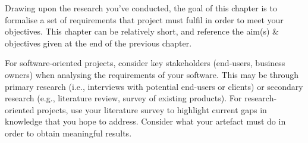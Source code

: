 Drawing upon the research you've conducted, the goal of this chapter is to formalise a set of requirements that project must fulfil in order to meet your objectives. This chapter can be relatively short, and reference the aim(s) \& objectives given at the end of the previous chapter. 

For software-oriented projects, consider key stakeholders (end-users, business owners) when analysing the requirements of your software. This may be through primary research (i.e., interviews with potential end-users or clients) or secondary research (e.g., literature review, survey of existing products). For research-oriented projects, use your literature survey to highlight current gaps in knowledge that you hope to address. Consider what your artefact must do in order to obtain meaningful results.